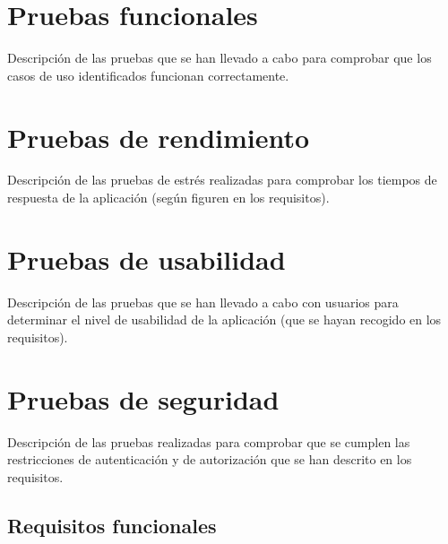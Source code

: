 \section{Pruebas funcionales}
Descripción de las pruebas que se han llevado a cabo para comprobar que los casos de uso
identificados funcionan correctamente.
\section{Pruebas de rendimiento}
Descripción de las pruebas de estrés realizadas para comprobar los tiempos de
respuesta de la aplicación (según figuren en los requisitos).
\section{Pruebas de usabilidad}
Descripción de las pruebas que se han llevado a cabo con usuarios para determinar el
nivel de usabilidad de la aplicación (que se hayan recogido en los requisitos).
\section{Pruebas de seguridad}
Descripción de las pruebas realizadas para comprobar que se cumplen las
restricciones de autenticación y de autorización que se han descrito
en los requisitos.


\subsection{Requisitos funcionales}

